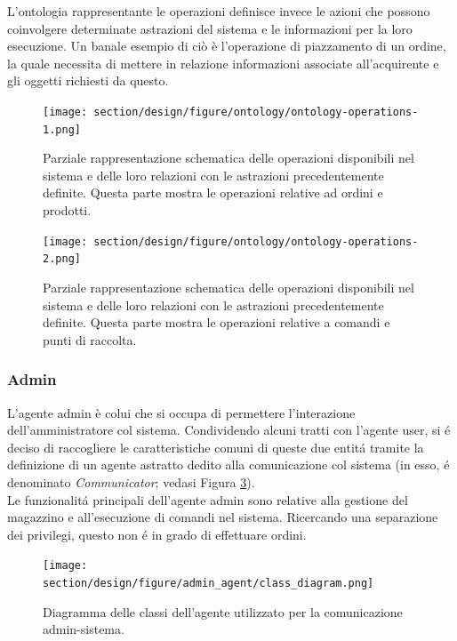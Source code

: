 %
\parag
L'ontologia rappresentante le operazioni definisce invece le azioni che possono coinvolgere determinate astrazioni del sistema e le informazioni per la loro esecuzione. Un banale esempio di ciò è l'operazione di piazzamento di un ordine, la quale necessita di mettere in relazione informazioni associate all'acquirente e gli oggetti richiesti da questo.
\begin{figure}[!ht]\centering
    \texttt{[image: section/design/figure/ontology/ontology-operations-1.png]}%
    \caption{Parziale rappresentazione schematica delle operazioni disponibili nel sistema e delle loro relazioni con le astrazioni precedentemente definite. Questa parte mostra le operazioni relative ad ordini e prodotti.}
    \label{fig:ontology_operations-1}
\end{figure}
\begin{figure}[!ht]\centering
    \texttt{[image: section/design/figure/ontology/ontology-operations-2.png]}%
    \caption{Parziale rappresentazione schematica delle operazioni disponibili nel sistema e delle loro relazioni con le astrazioni precedentemente definite. Questa parte mostra le operazioni relative a comandi e punti di raccolta.}
    \label{fig:ontology_operations-2}
\end{figure}%

\subsubsection{Admin}
L'agente admin \`e colui che si occupa di permettere l'interazione dell'amministratore col sistema. Condividendo alcuni tratti con l'agente user, si \'e deciso di raccogliere le caratteristiche comuni di queste due entit\'a tramite la definizione di un agente astratto dedito alla comunicazione col sistema (in esso, \'e denominato \textit{Communicator}; vedasi Figura \ref{fig:class_diagram_admin_agent}).\\
Le funzionalit\'a principali dell'agente admin sono relative alla gestione del magazzino e all'esecuzione di comandi nel sistema. Ricercando una separazione dei privilegi, questo non \'e in grado di effettuare ordini.
\begin{figure}[ht]
    \texttt{[image: section/design/figure/admin\_agent/class\_diagram.png]}
    \caption{Diagramma delle classi dell'agente utilizzato per la comunicazione admin-sistema.}
    \label{fig:class_diagram_admin_agent}
\end{figure}

